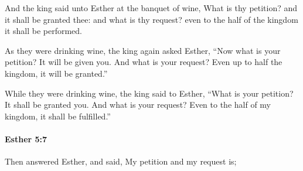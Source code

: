 			\begin{versebox}
					\item[BHS] 
					\item[LXX] 
					\item[ASV] And the king said unto Esther at the banquet of wine, What is thy petition? and it shall be granted thee: and what is thy request? even to the half of the kingdom it shall be performed.
					\item[NIV] As they were drinking wine, the king again asked Esther, “Now what is your petition? It will be given you. And what is your request? Even up to half the kingdom, it will be granted.”
					\item[NRSV] While they were drinking wine, the king said to Esther, “What is your petition? It shall be granted you. And what is your request? Even to the half of my kingdom, it shall be fulfilled.”
			\end{versebox}

		\paragraph{Esther 5:7} %
			\label{ESTHER-5-7}

			Then answered Esther, and said, My petition and my request is;

